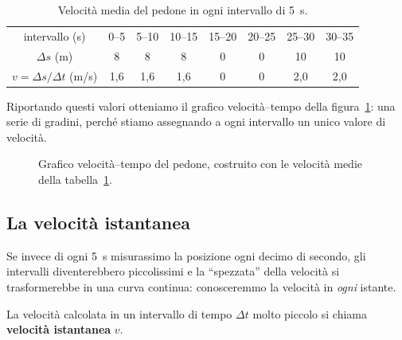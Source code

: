 \begin{table}[!htbp]
    \centering
    \begin{tabular}{c|ccccccc}
        \toprule
        intervallo (s) & 0--5 & 5--10 & 10--15 & 15--20 & 20--25 & 25--30 & 30--35 \\
        $\Delta s$ (m) & 8 & 8 & 8 & 0 & 0 & 10 & 10 \\
        $v = \Delta s / \Delta t$ (m/s) & 1{,}6 & 1{,}6 & 1{,}6 & 0 & 0 & 2{,}0 & 2{,}0 \\
        \bottomrule
    \end{tabular}
    \caption{Velocità media del pedone in ogni intervallo di \SI{5}{\second}.}
    \label{tab:camminatore-v}
\end{table}

Riportando questi valori otteniamo il grafico velocità--tempo della figura~\ref{fig:vt-camminatore}: una serie di gradini, perché stiamo assegnando a ogni intervallo un unico valore di velocità.

\begin{figure}[!htbp]
    \centering
    \caption{Grafico velocità--tempo del pedone, costruito con le velocità medie della tabella~\ref{tab:camminatore-v}.}
    \label{fig:vt-camminatore}
\end{figure}

\subsection{La velocità istantanea}
Se invece di ogni \SI{5}{\second} misurassimo la posizione ogni decimo di secondo, gli intervalli diventerebbero piccolissimi e la ``spezzata'' della velocità si trasformerebbe in una curva continua: conosceremmo la velocità in \emph{ogni} istante.

\begin{definizione}
La velocità calcolata in un intervallo di tempo $\Delta t$ molto piccolo si chiama \textbf{velocità istantanea} $v$.
\end{definizione}

